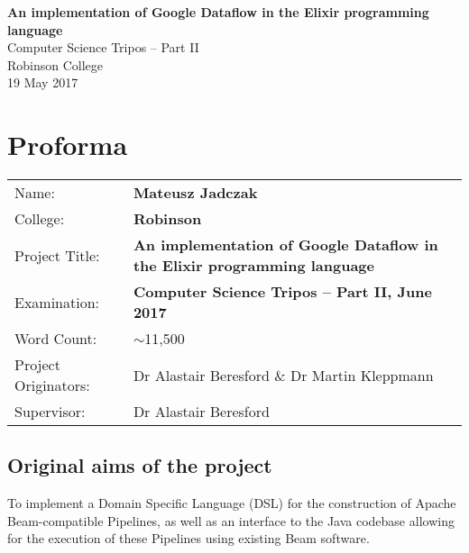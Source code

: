 
\begin{titlepage}

\vspace*{60mm}
\begin{center}
\Huge
\textbf{An implementation of Google Dataflow in the Elixir programming language} \\[5mm]
Computer Science Tripos -- Part II \\[5mm]
Robinson College \\[5mm]
19 May 2017 \\[20mm]
\end{center}
\end{titlepage}



{\let\cleardoublepage\clearpage \chapter*{Proforma} %

{\large\tabulinesep=1mm
\begin{tabu}{lX[p]}
Name:               & \textbf {Mateusz Jadczak}                       \\
College:            & \textbf {Robinson}                     \\
Project Title:      & {\textbf{An implementation of Google Dataflow in the Elixir programming language}} \\
Examination:        & \textbf {Computer Science Tripos -- Part II, June 2017}  \\
Word Count:         & $\sim$11,500\footnotemark[1]  \\
Project Originators: & Dr Alastair Beresford \& Dr Martin Kleppmann     \\
Supervisor:         &   Dr Alastair Beresford           \\ 
\end{tabu}
}

\bigskip

\section*{Original aims of the project}

To implement a Domain Specific Language (DSL) for the construction of Apache Beam-compatible Pipelines, as well as an interface to the Java codebase allowing for the execution of these Pipelines using existing Beam software.

}
